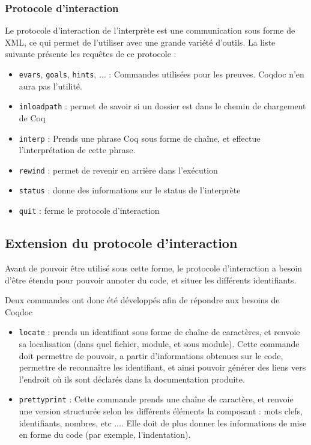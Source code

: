 \documentclass[a4paper, 11pt]{report}
\begin{document}
    \subsubsection{Protocole d'interaction}
    Le protocole d'interaction de l'interprète est une communication sous forme
    de XML, ce qui permet de l'utiliser avec une grande variété d'outils.
    La liste suivante présente les requêtes de ce protocole :
    \begin{itemize}
      \item \texttt{evars}, \texttt{goals}, \texttt{hints}, $\ldots$ : Commandes utilisées pour les preuves.
      Coqdoc n'en aura pas l'utilité.
    \item \texttt{inloadpath} : permet de savoir si un dossier est dans le chemin
      de chargement de Coq
    \item \texttt{interp} : Prends une phrase Coq sous forme de chaîne, et effectue
      l'interprétation de cette phrase.
    \item \texttt{rewind} : permet de revenir en arrière dans l'exécution
    \item \texttt{status} : donne des informations sur le status de l'interprète
      \item \texttt{quit} : ferme le protocole d'interaction
    \end{itemize}

    \subsection{Extension du protocole d'interaction}
    Avant de pouvoir être utilisé sous cette forme, le protocole d'interaction
    a besoin d'être étendu pour pouvoir annoter du code, et situer les
    différents identifiants.

    Deux commandes ont donc été développés afin de répondre aux besoins de Coqdoc
    \begin{itemize}
      \item \texttt{locate} : prends un identifiant sous forme de chaîne de caractères,
      et renvoie sa localisation (dans quel fichier, module, et sous module).
      Cette commande doit permettre de pouvoir, a partir d'informations obtenues
      sur le code, permettre de reconnaître les identifiant, et ainsi pouvoir
     générer des liens vers l'endroit où ils sont déclarés dans la documentation
     produite.
      \item \texttt{prettyprint} :
      Cette commande prends une chaîne de caractère, et renvoie une version
      structurée selon les différents éléments la composant : mots clefs,
      identifiants, nombres, etc $\ldots$. Elle doit de plus donner
      les informations de mise en forme du code (par exemple, l'indentation). \\
    \end{itemize}
\end{document}
